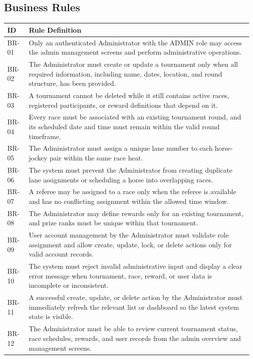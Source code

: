 \subsection{Business Rules}

\begin{table}[H]
    \centering
    \begin{tabular}{|l|p{12cm}|}
        \hline
        \textbf{ID} & \textbf{Rule Definition} \\
        \hline
        BR-01 & Only an authenticated Administrator with the ADMIN role may access the admin management screens and perform administrative operations. \\
        \hline
        BR-02 & The Administrator must create or update a tournament only when all required information, including name, dates, location, and round structure, has been provided. \\
        \hline
        BR-03 & A tournament cannot be deleted while it still contains active races, registered participants, or reward definitions that depend on it. \\
        \hline
        BR-04 & Every race must be associated with an existing tournament round, and its scheduled date and time must remain within the valid round timeframe. \\
        \hline
        BR-05 & The Administrator must assign a unique lane number to each horse-jockey pair within the same race heat. \\
        \hline
        BR-06 & The system must prevent the Administrator from creating duplicate lane assignments or scheduling a horse into overlapping races. \\
        \hline
        BR-07 & A referee may be assigned to a race only when the referee is available and has no conflicting assignment within the allowed time window. \\
        \hline
        BR-08 & The Administrator may define rewards only for an existing tournament, and prize ranks must be unique within that tournament. \\
        \hline
        BR-09 & User account management by the Administrator must validate role assignment and allow create, update, lock, or delete actions only for valid account records. \\
        \hline
        BR-10 & The system must reject invalid administrative input and display a clear error message when tournament, race, reward, or user data is incomplete or inconsistent. \\
        \hline
        BR-11 & A successful create, update, or delete action by the Administrator must immediately refresh the relevant list or dashboard so the latest system state is visible. \\
        \hline
        BR-12 & The Administrator must be able to review current tournament status, race schedules, rewards, and user records from the admin overview and management screens. \\
        \hline
    \end{tabular}
    \label{tab:admin_business_rules}
\end{table}

